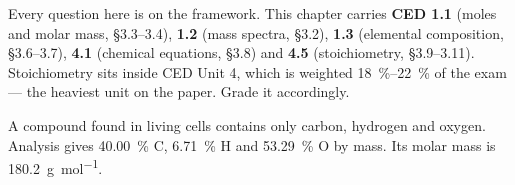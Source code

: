 \documentclass{apchem-exam}
\begin{document}
\apctitleblock

\begin{apcnote}[Scope]
Every question here is on the framework. This chapter carries
\textbf{CED 1.1} (moles and molar mass, \S3.3--3.4), \textbf{1.2} (mass
spectra, \S3.2), \textbf{1.3} (elemental composition, \S3.6--3.7),
\textbf{4.1} (chemical equations, \S3.8) and \textbf{4.5} (stoichiometry,
\S3.9--3.11). Stoichiometry sits inside CED Unit 4, which is weighted
\SI{18}{\percent}--\SI{22}{\percent} of the exam --- the heaviest unit on
the paper. Grade it accordingly.
\end{apcnote}



A compound found in living cells contains only carbon, hydrogen and
oxygen. Analysis gives \SI{40.00}{\percent} C, \SI{6.71}{\percent} H and
\SI{53.29}{\percent} O by mass. Its molar mass is
\SI{180.2}{\gram\per\mole}.
\end{document}

